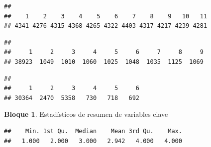 \documentclass[]{book}
\newenvironment{Shaded}{\begin{snugshade}}{\end{snugshade}}
\newcommand{\KeywordTok}[1]{\textcolor[rgb]{0.13,0.29,0.53}{\textbf{#1}}}
\newcommand{\NormalTok}[1]{#1}
\newcommand{\OperatorTok}[1]{\textcolor[rgb]{0.81,0.36,0.00}{\textbf{#1}}}
\theoremstyle{definition}
\theoremstyle{definition}
\newtheorem{example}{Bloque}[chapter]
\theoremstyle{definition}
\theoremstyle{definition}
\theoremstyle{remark}
\begin{document}
\begin{verbatim}
## 
##    1    2    3    4    5    6    7    8    9   10   11 
## 4341 4276 4315 4368 4265 4322 4403 4317 4217 4239 4281
\end{verbatim}

\begin{Shaded}
\end{Shaded}

\begin{verbatim}
## 
##     1     2     3     4     5     6     7     8     9 
## 38923  1049  1010  1060  1025  1048  1035  1125  1069
\end{verbatim}

\begin{Shaded}
\end{Shaded}

\begin{verbatim}
## 
##     1     2     3     4     5     6 
## 30364  2470  5358   730   718   692
\end{verbatim}

\begin{example}
\protect\hypertarget{exm:bloque37nbm}{}{\label{exm:bloque37nbm} }Estadísticos de resumen de variables clave
\end{example}

\begin{Shaded}
\end{Shaded}

\begin{verbatim}
##    Min. 1st Qu.  Median    Mean 3rd Qu.    Max. 
##   1.000   2.000   3.000   2.942   4.000   4.000
\end{verbatim}

\begin{Shaded}
\end{Shaded}
\end{document}
